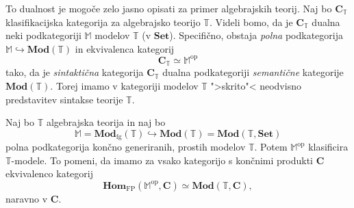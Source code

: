 \documentclass[../kategoricna_logika.tex]{subfiles}
\begin{document}
To dualnost je mogoče zelo jasno opisati za primer algebrajskih
teorij. Naj bo \(\mathbf{C}_{\mathbb{T}}\) klasifikacijska kategorija
za algebrajsko teorijo \(\mathbb{T}\). Videli bomo, da je \(\mathbf{C}_{\mathbb{T}}\)
dualna neki podkategoriji \(\mathbb{M}\) modelov \(\mathbb{T}\) (v \(\mathbf{Set}\)).
Specifično, obstaja \emph{polna} podkategorija 
\(\mathbb{\mathbb{M}} \hookrightarrow \mathbf{Mod}(\mathbb{T})\) in
ekvivalenca kategorij
\[ \mathbf{C}_{\mathbb{T}} \simeq \mathbb{M}^{\mathrm{op}} \]
tako, da je \emph{sintaktična} kategorija \(\mathbf{C}_{\mathbb{T}}\) dualna
podkategoriji \emph{semantične} ka\-tegorije \(\mathbf{Mod}(\mathbb{T})\).
Torej imamo v kategoriji modelov \(\mathbb{T}\) ">skrito"< neodvisno
predstavitev sintakse teorije \(\mathbb{T}\).
\begin{izrek}
  Naj bo $\mathbb{T}$ algebrajska teorija in naj bo
  \[ \mathbb{M} = \mathbf{Mod}_{\mathrm{fg}}(\mathbb{T}) \hookrightarrow \mathbf{Mod}(\mathbb{T}) = \mathbf{Mod}(\mathbb{T}, \mathbf{Set}) \]
  polna podkategorija končno generiranih, prostih modelov $\mathbb{T}$.
  Potem $\mathbb{M}^{\mathrm{op}}$ klasificira $\mathbb{T}$-modele.
  To pomeni, da imamo za vsako kategorijo s končnimi produkti $\mathbf{C}$ ekvivalenco kategorij
  \[ \mathbf{Hom}_{\mathrm{FP}}(\mathbb{M}^{\mathrm{op}}, \mathbf{C}) \simeq \mathbf{Mod}(\mathbb{T},\mathbf{C}), \]
  naravno v $\mathbf{C}$.
\end{izrek}
\end{document}
